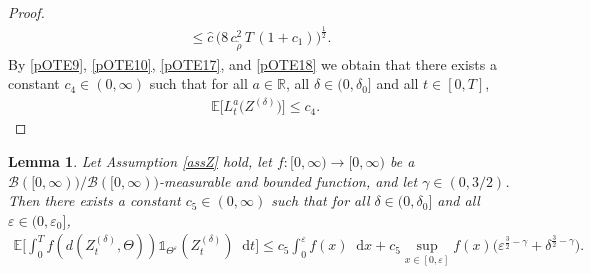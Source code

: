 \documentclass[11pt,a4paper]{article}
\numberwithin{equation}{section}
\newtheorem{lemma}[theorem]{Lemma}
\theoremstyle{definition}
\newcommand{\E}{{\mathbb{E}}}
\newcommand{\R}{{\mathbb{R}}}
\newcommand{\diff}{\mathop{}\!\mathrm{d}}
\begin{document}
\begin{proof}
\begin{equation}
\begin{aligned}
    \leq \hat c\, \Big(8\,c_{\widetilde\rho}^2\, T\, (1+ c_1)\Big)^\frac{1}{2}.
    \end{aligned}
\end{equation}
By \eqref{pOTE9}, \eqref{pOTE10}, \eqref{pOTE17}, and \eqref{pOTE18}  we obtain that there exists a constant $ c_4 \in(0,\infty)$ such that for all $a\in\R$, all $\delta \in(0,\delta_0]$ and all $t\in[0,T]$,
\begin{equation}\label{pOTE19}
    \begin{aligned}
    &\E\big[L^a_t \big(Z^{(\delta)}\big)\big] 
    \leq c_4.
    \end{aligned}
\end{equation}
\end{proof}

\begin{lemma}\label{EVofOTF}
    Let Assumption \ref{assZ} hold, let $f\colon[0,\infty)\to[0,\infty)$ be a $\mathcal{B}([0,\infty))/\mathcal{B}([0,\infty))$-measurable and bounded function, and let $\gamma\in(0,3/2)$. Then there exists a constant $c_5\in(0,\infty)$ such that for all $\delta\in(0,\delta_0]$ and all $\varepsilon \in(0,\varepsilon_0]$,
    \begin{equation}
        \begin{aligned}
            \E\Big[\int_0^T f(d(Z^{(\delta)}_t,\Theta))\mathds{1}_{\Theta^\varepsilon}(Z^{(\delta)}_t)\diff t]
            \leq c_5 \int_0^\varepsilon f(x)\diff x + c_5 \sup_{x\in[0,\varepsilon]}f(x) \big(\varepsilon^{\frac{3}{2}-\gamma } +\delta^{\frac{3}{2}-\gamma}\big).
        \end{aligned}
    \end{equation}
\end{lemma}
\end{document}
